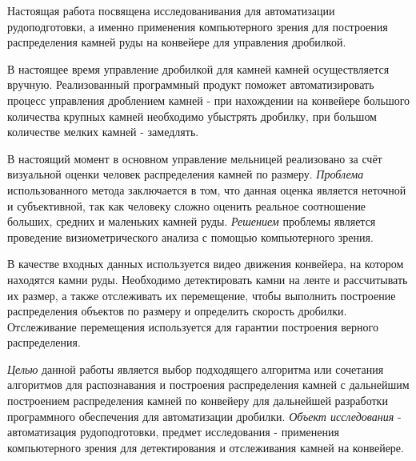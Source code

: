 \documentclass[specification,annotation,times]{itmo-student-thesis}
\begin{document}


\tableofcontents

\startprefacepage
Настоящая работа посвящена исследованивания для автоматизации рудоподготовки, а именно применения компьютерного зрения для построения распределения камней руды на конвейере для управления дробилкой.

В настоящее время управление дробилкой для камней камней осуществляется вручную. Реализованный программный продукт поможет автоматизировать процесс управления дроблением камней - при нахождении на конвейере большого количества крупных камней необходимо убыстрять дробилку, при большом количестве мелких камней - замедлять. 


В настоящий момент в основном управление мельницей реализовано за счёт визуальной  оценки  человек распределения камней по размеру. \textit{Проблема} использованного метода заключается в том, что данная оценка является неточной и субъективной, так как человеку сложно оценить реальное соотношение больших, средних и маленьких камней руды. \textit{Решением} проблемы является проведение визиометрического анализа с помощью компьютерного зрения.

В качестве входных данных используется видео движения конвейера, на котором находятся камни руды. Необходимо детектировать камни на ленте и рассчитывать их размер, а также  отслеживать их перемещение, чтобы выполнить построение распределения объектов по размеру и определить скорость дробилки. Отслеживание перемещения используется для гарантии построения верного распределения. 

	
\textit{Целью} данной работы является выбор подходящего алгоритма или сочетания алгоритмов для распознавания и построения распределения камней с дальнейшим построением распределения камней по конвейеру для дальнейшей разработки программного обеспечения для автоматизации дробилки. \textit{Объект исследования} - автоматизация рудоподготовки, предмет исследования - применения компьютерного зрения для детектирования и отслеживания камней на конвейере. 
\end{document}
